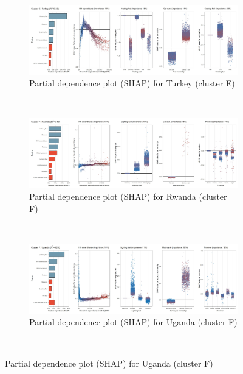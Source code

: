 \begin{figure}[ht!]\ContinuedFloat
    \centering
   \begin{subfigure}[b]{\textwidth}
     \centering
         \caption{Partial dependence plot (SHAP) for Turkey (cluster E)}
         \label{fig:5b_TUR}
         \includegraphics[width=\textwidth]{Figure 5b/Figure_5b_TUR}      
        \end{subfigure}
    \\
    \vspace{0.5cm}
   \begin{subfigure}[b]{\textwidth}
   \centering
         \caption{Partial dependence plot (SHAP) for Rwanda (cluster F)}
         \label{fig:5b_RWA}
         \includegraphics[width=\textwidth]{Figure 5b/Figure_5b_RWA}          
     \end{subfigure}
    \\
    \vspace{0.5cm}
   \begin{subfigure}[b]{\textwidth} 
   \centering
         \caption{Partial dependence plot (SHAP) for Uganda (cluster F)}
         \label{fig:5b_UGA}
         \includegraphics[width=\textwidth]{Figure 5b/Figure_5b_UGA}
    \end{subfigure}
    \\
    \vspace{0.5cm}


\end{figure}
